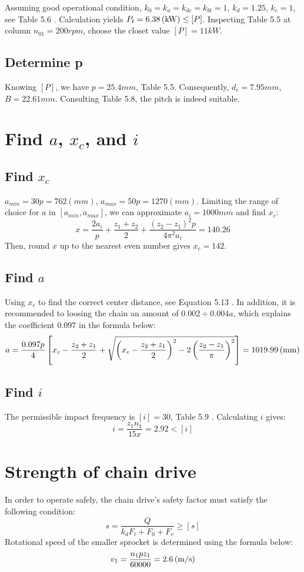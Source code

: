 Assuming good operational condition, $ k_0=k_a=k_{dc}=k_{bt}=1 $, $ k_d=1.25 $, $ k_c=1 $, see Table 5.6 \cite{tk1}. Calculation yields $ P_t=6.38\, (\mathrm{kW})\leq [P] $. Inspecting Table 5.5 \cite{tk1} at column $ n_{01}=200\unit{rpm} $, choose the closet value $ [P]=11\unit{kW} $.
\subsection{Determine p}
Knowing $ [P] $, we have $ p= 25.4\unit{mm}$, Table 5.5. Consequently, $ d_c=7.95\unit{mm} $, $ B=22.61\unit{mm} $. Consulting Table 5.8, the pitch is indeed suitable.

\section{Find $ a $, $ x_c $, and $ i $}

\subsection{Find $ x_c $}
$ a_{min} = 30p = 762 \unit{(mm)} $, $ a_{max} = 50p = 1270 \unit{(mm)}$. Limiting the range of choice for $ a $ in $ [a_{min},a_{max}] $, we can approximate $ a_i= 1000 \unit{mm} $ and find $ x_c $:
\[x = \dfrac{2a_i}{p} + \dfrac{z_1+z_2}{2} + \dfrac{(z_2-z_1)^2p}{4\pi^2a_i} = 140.26\] 
Then, round $ x $ up to the nearest even number gives $ x_c = 142$.

\subsection{Find $ a $}
Using $ x_c $ to find the correct center distance, see Equation 5.13 \cite{tk1}. In addition, it is recommended to loosing the chain an amount of $ 0.002\div0.004 a $, which explains the coefficient $ 0.097 $ in the formula below:
\[a = \dfrac{0.097p}{4}\left[x_c-\dfrac{z_2+z_1}{2}+\sqrt{\left(x_c-\dfrac{z_2+z_1}{2}\right)^2-2\left(\dfrac{z_2-z_1}{\pi}\right)^2}\right]= 1019.99 \, (\mathrm{mm})\]

\subsection{Find $ i $} The permissible impact frequency is $ [i]=30 $, Table 5.9 \cite{tk1}. Calculating $ i $ gives:
\[i=\dfrac{z_1n_1}{15x}=2.92<[i]\]


\section{Strength of chain drive}
In order to operate safely, the chain drive's safety factor must satisfy the following condition:
\[s = \dfrac{Q}{k_dF_t+F_0+F_v} \geq [s]\]
Rotational speed of the smaller sprocket is determined using the formula below:
\[v_1=\dfrac{n_1pz_1}{60000}= 2.6 \, (\mathrm{m/s})\]

